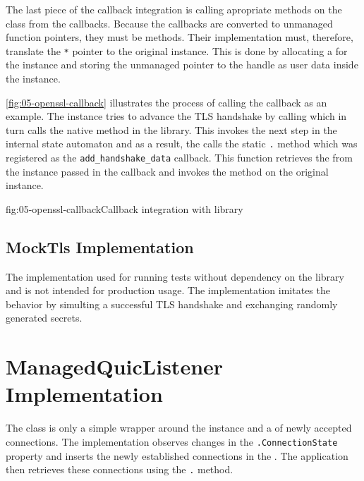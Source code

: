 The last piece of the \libopenssl{} callback integration is calling apropriate methods on the
\ManagedQuicConnection{} class from the callbacks. Because the callbacks are converted to unmanaged
function pointers, they must be  methods. Their implementation must, therefore,
translate the \texttt{\SSL{}*} pointer to the original \OpenSslTls{} instance. This is done by
allocating a  for the \OpenSslTls{} instance and storing the unmanaged pointer to
the handle as user data inside the \SSL{} instance.

\autoref{fig:05-openssl-callback} illustrates the process of calling the 
callback as an example. The \ManagedQuicConnection{} instance tries to advance the TLS handshake by
calling  which in turn calls the  native method
in the \libopenssl{} library. This invokes the next step in the internal state automaton and as a
result, the \libopenssl{} calls the static \texttt{\OpenSslTls{}.} method
which was registered as the \texttt{add_handshake_data} callback. This function retrieves the
 from the \SSL{} instance passed in the callback and invokes the
 method on the original \ManagedQuicConnection{} instance.

\begin{myFigure}{fig:05-openssl-callback}{Callback integration with \libopenssl{} library}

  \resizebox{\linewidth}{!}{}

\end{myFigure}

\subsection{MockTls Implementation}

The \MockTls{} implementation used for running tests without dependency on the \libopenssl{} library
and is not intended for production usage. The implementation imitates the \OpenSslTls{} behavior by
simulting a successful TLS handshake and exchanging randomly generated secrets.

\section{ManagedQuicListener Implementation}

The \ManagedQuicListener{} class is only a simple wrapper around the \QuicServerSocketContext{}
instance and a \ChannelOf{\ManagedQuicConnection{}} of newly accepted connections. The
\QuicServerSocketContext{} implementation observes changes in the
\texttt{\ManagedQuicConnection{}.ConnectionState} property and inserts the newly established
connections in the . The application then retrieves these connections using the
\texttt{\ManagedQuicListener{}.} method.

